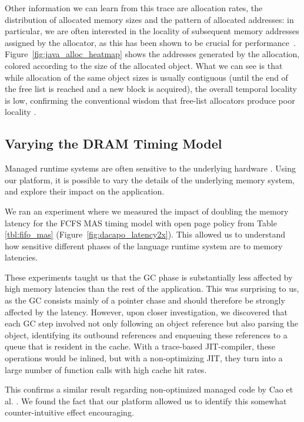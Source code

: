 Other information we can learn from this trace are allocation rates, the
distribution of allocated memory sizes and the pattern of allocated addresses:
in particular, we are often interested in the locality of subsequent memory
addresses assigned by the allocator, as this has been shown to be crucial for
performance~\cite{Blackburn:2004:OWH:998675.999420}.
Figure~\ref{fig:java_alloc_heatmap} shows the addresses generated by the
allocation, colored according to the size of the allocated object. What we can
see is that while allocation of the same object sizes is usually contiguous
(until the end of the free list is reached and a new block is acquired), the
overall temporal locality is low, confirming the conventional wisdom that
free-list allocators produce poor locality
\cite{Blackburn:2004:OWH:998675.999420}.

\subsection{Varying the DRAM Timing Model}

Managed runtime systems are often sensitive to the underlying hardware
\cite{Cao:2012:YYP:2337159.2337185}. Using our platform, it is possible to vary
the details of the underlying memory system, and explore their impact on the
application.

We ran an experiment where we measured the impact of doubling the memory
latency for the FCFS MAS timing model with open page policy from Table
\ref{tbl:fifo_mas} (Figure~\ref{fig:dacapo_latency2x}). This allowed us to
understand how sensitive different phases of the language runtime system are to
memory latencies.

These experiments taught us that the GC phase is substantially less affected by
high memory latencies than the rest of the application. This was surprising to
us, as the GC consists mainly of a pointer chase and should therefore be
strongly affected by the latency. However, upon closer investigation, we
discovered that each GC step involved not only following an object reference
but also parsing the object, identifying its outbound references and enqueuing
these references to a queue that is resident in the cache. With a trace-based
JIT-compiler, these operations would be inlined, but with a non-optimizing JIT,
they turn into a large number of function calls with high cache hit rates.

This confirms a similar result regarding non-optimized managed code by Cao et
al. \cite{Cao:2012:YYP:2337159.2337185}. We found the fact that our platform
allowed us to identify this somewhat counter-intuitive effect encouraging.

